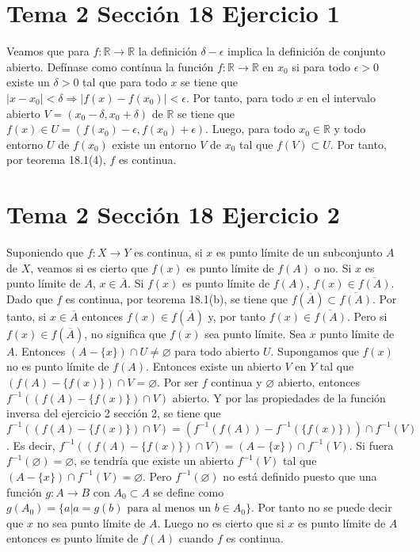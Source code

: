 \documentclass{article}
\begin{document}
\section{Tema 2 Sección 18 Ejercicio 1}
Veamos que para $f:\mathbb{R}\rightarrow \mathbb{R}$ la definición $\delta-\epsilon$ implica la definición de conjunto abierto. Defínase como contínua la función $f:\mathbb{R}\rightarrow \mathbb{R}$ en $x_0$ si para todo $\epsilon>0$ existe un $\delta>0$ tal que para todo $x$ se tiene que $\vert x-x_0\vert <\delta\Rightarrow\vert f(x)-f(x_0)\vert<\epsilon $. Por tanto, para todo $x$ en el intervalo abierto $V=(x_0-\delta,x_0+\delta)$ de $\mathbb{R}$ se tiene que $f(x)\in U=(f(x_0)-\epsilon,f(x_0)+\epsilon)$. Luego, para todo $x_0\in \mathbb{R}$ y todo  entorno $U$ de $f(x_0)$ existe un entorno $V$ de $x_0$ tal que $f(V) \subset U$. Por tanto, por teorema 18.1(4), $f$ es continua. 

\section{Tema 2 Sección 18 Ejercicio 2}
Suponiendo que $f:X\rightarrow Y$ es continua, si $x$ es punto límite de un subconjunto $A$ de $X$, veamos si es cierto que $f(x)$ es punto límite de $f(A)$ o no. Si $x$ es punto límite de $A$, $x\in \overline{A}$. Si $f(x)$ es punto límite de $f(A)$, $f(x)\in \overline{f(A)}$. Dado que $f$ es continua, por teorema 18.1(b), se tiene que $f(\overline{A})\subset\overline{f(A)}$. Por tanto, si $x\in \overline{A}$ entonces $f(x)\in f(\overline{A})$ y, por tanto $f(x)\in \overline{f(A)}$. Pero si $f(x)\in f(\overline{A})$, no significa que $f(x)$ sea punto límite. Sea $x$ punto límite de $A$. Entonces $(A-\{x\})\cap U\neq \varnothing$ para todo abierto $U$. Supongamos que $f(x)$ no es punto límite de $f(A)$. Entonces existe un abierto $V$ en $Y$ tal que $(f(A)-\{f(x)\})\cap V=\varnothing $.  Por ser $f$ continua y $\varnothing$ abierto, entonces  $f^{-1}((f(A)-\{f(x)\})\cap V)$ abierto. Y por las propiedades de la función inversa del ejercicio 2 sección 2, se tiene que $f^{-1}((f(A)-\{f(x)\})\cap V)=(f^{-1}(f(A))-f^{-1}(\{f(x)\}))\cap f^{-1}(V)$. Es decir, $f^{-1}((f(A)-\{f(x)\})\cap V)=(A-\{x\})\cap f^{-1}(V)$.  Si fuera $f^{-1}(\varnothing)=\varnothing$, se tendría que existe un abierto $f^{-1}(V)$ tal que $(A-\{x\})\cap f^{-1}(V)=\varnothing$. Pero $f^{-1}(\varnothing)$ no está definido puesto que una función $g:A\rightarrow B$ con $A_0\subset A$ se define como $g(A_0)=\{a|a=g(b)\text{ para al menos un }b\in A_0\}$. Por tanto  no se puede decir que $x$ no sea punto límite de $A$. Luego no es cierto que si $x$ es punto límite de $A$ entonces es punto límite de $f(A)$ cuando $f$ es continua.
\end{document}
